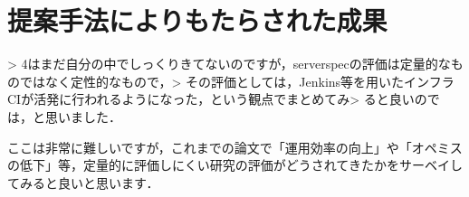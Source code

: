 \section{提案手法によりもたらされた成果}

> 4はまだ自分の中でしっくりきてないのですが，serverspecの評価は定量的なものではなく定性的なもので，> その評価としては，Jenkins等を用いたインフラCIが活発に行われるようになった，という観点でまとめてみ> ると良いのでは，と思いました．

ここは非常に難しいですが，これまでの論文で「運用効率の向上」や「オペミスの低下」等，定量的に評価しにくい研究の評価がどうされてきたかをサーベイしてみると良いと思います．

